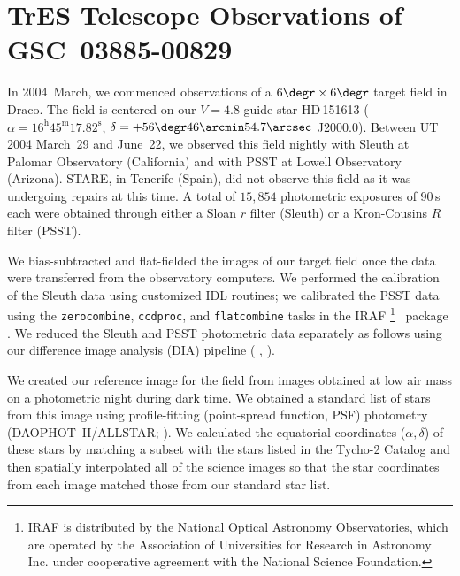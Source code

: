 \section{TrES Telescope Observations of \\ \mbox{GSC 03885-00829}}\label{cha:gsc:sec:tres}

In 2004~March, we commenced observations of a $6\degr\times6\degr$
target field in Draco. The field is centered on our $V=4.8$ guide star
\mbox{HD\,151613} (\mbox{$\alpha = 16^{\mathrm h} 45^{\mathrm m}
17.82^{\mathrm s}$}, \mbox{$\delta = +56\degr 46\arcmin 54.7\arcsec$} J2000.0). Between
UT 2004 March~29 and June~22, we observed this field nightly with
Sleuth at Palomar Observatory (California) and with PSST at Lowell
Observatory (Arizona). STARE, in Tenerife (Spain), did not observe
this field as it was undergoing repairs at this time. A total of $15,\!854$
photometric exposures of 90\,s each were obtained through either a
Sloan $r$ filter (Sleuth) or a Kron-Cousins $R$ filter (PSST).

We bias-subtracted and flat-fielded the images of our target field
once the data were transferred from the observatory computers. We
performed the calibration of the Sleuth data using customized IDL
routines; we calibrated the PSST data using the \texttt{zerocombine},
\texttt{ccdproc}, and \texttt{flatcombine} tasks in the IRAF%
\footnote{IRAF is distributed by the National Optical Astronomy
  Observatories, which are operated by the Association of Universities
  for Research in Astronomy Inc. under cooperative agreement with
  the National Science Foundation.}%
\ package \citep{Tody:1993a}. We reduced the Sleuth and PSST
photometric data separately as follows using our difference image
analysis (DIA) pipeline (%
\citealp[described in][]{Dunham_Mandushev_Taylor:pasp:2004a},
\citealp[and based in part on][]{Alard:aas:2000a}).

We created our reference image for the field from images obtained at
low air mass on a photometric night during dark time. We obtained a
standard list of stars from this image using profile-fitting (point-spread function, PSF)
photometry (\mbox{DAOPHOT II}/ALLSTAR;
\citealt{Stetson:pasp:1987a, Stetson:ASP:1992a}). We calculated the
equatorial coordinates ($\alpha,\delta$) of these stars by matching a
subset with the stars listed in the Tycho-2 Catalog
\citep{Hog_Fabricius_Makarov:aa:2000a} and then spatially
interpolated all of the science images so that the star coordinates
from each image matched those from our standard star list.

